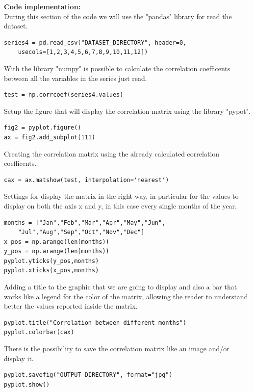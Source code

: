 \textbf{Code implementation:}\\
During this section of the code we will use the "pandas" library for read the dataset.
\begin{lstlisting}
series4 = pd.read_csv("DATASET_DIRECTORY", header=0, 
	usecols=[1,2,3,4,5,6,7,8,9,10,11,12])
\end{lstlisting}

With the library "numpy" is possible to calculate the correlation coefficents between all the variables in the series just read.
\begin{lstlisting}
test = np.corrcoef(series4.values)
\end{lstlisting}

Setup the figure that will display the correlation matrix using the library "pypot".
\begin{lstlisting}
fig2 = pyplot.figure()
ax = fig2.add_subplot(111)
\end{lstlisting}

Creating the correlation matrix using the already calculated correlation coefficents.
\begin{lstlisting}
cax = ax.matshow(test, interpolation='nearest')
\end{lstlisting}

Settings for display the matrix in the right way, in particular for the values to display on both the axis x and y, in this case every single months of the year.
\begin{lstlisting}
months = ["Jan","Feb","Mar","Apr","May","Jun",
	"Jul","Aug","Sep","Oct","Nov","Dec"]
x_pos = np.arange(len(months))
y_pos = np.arange(len(months))
pyplot.yticks(y_pos,months)
pyplot.xticks(x_pos,months)
\end{lstlisting}
\newpage
Adding a title to the graphic that we are going to display and also a bar that works like a legend for the color of the matrix, allowing the reader to understand better the values reported inside the matrix.
\begin{lstlisting}
pyplot.title("Correlation between different months")
pyplot.colorbar(cax)
\end{lstlisting}

There is the possibility to save the correlation matrix like an image and/or display it.
\begin{lstlisting}
pyplot.savefig("OUTPUT_DIRECTORY", format="jpg")
pyplot.show()
\end{lstlisting}

